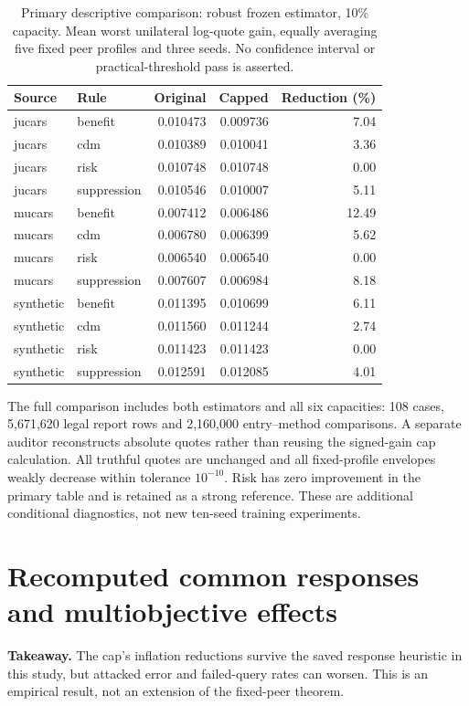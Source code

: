 \documentclass[11pt]{article}
\begin{document}
\begin{table}[ht]
\centering\small
\caption{Primary descriptive comparison: robust frozen estimator, 10\% capacity.
Mean worst unilateral log-quote gain, equally averaging five fixed peer profiles
and three seeds. No confidence interval or practical-threshold pass is asserted.}
\begin{tabular}{llrrr}\toprule
Source & Rule & Original & Capped & Reduction (\%)\\\midrule
jucars & benefit & 0.010473 & 0.009736 & 7.04 \\
jucars & cdm & 0.010389 & 0.010041 & 3.36 \\
jucars & risk & 0.010748 & 0.010748 & 0.00 \\
jucars & suppression & 0.010546 & 0.010007 & 5.11 \\
mucars & benefit & 0.007412 & 0.006486 & 12.49 \\
mucars & cdm & 0.006780 & 0.006399 & 5.62 \\
mucars & risk & 0.006540 & 0.006540 & 0.00 \\
mucars & suppression & 0.007607 & 0.006984 & 8.18 \\
synthetic & benefit & 0.011395 & 0.010699 & 6.11 \\
synthetic & cdm & 0.011560 & 0.011244 & 2.74 \\
synthetic & risk & 0.011423 & 0.011423 & 0.00 \\
synthetic & suppression & 0.012591 & 0.012085 & 4.01 \\
\bottomrule\end{tabular}
\end{table}

The full comparison includes both estimators and all six capacities: 108 cases,
5,671,620 legal report rows and 2,160,000 entry--method comparisons. A separate
auditor reconstructs absolute quotes rather than reusing the signed-gain cap
calculation. All truthful quotes are unchanged and all fixed-profile envelopes
weakly decrease within tolerance $10^{-10}$. Risk has zero improvement in the
primary table and is retained as a strong reference. These are additional
conditional diagnostics, not new ten-seed training experiments.


\section{Recomputed common responses and multiobjective effects}
\noindent\textbf{Takeaway.} The cap's inflation reductions survive the saved
response heuristic in this study, but attacked error and failed-query rates
can worsen. This is an empirical result, not an extension of the fixed-peer theorem.
\end{document}
